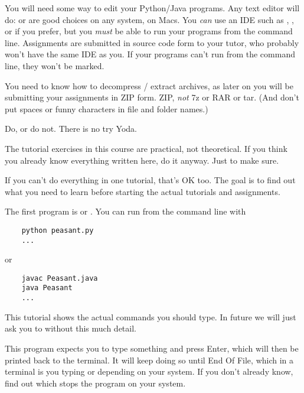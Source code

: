You will need some way to edit your Python/Java programs. Any text editor will do:
 or  are good choices on any system,  on
Macs. You \emph{can} use an IDE such as , , or 
if you prefer, but you \emph{must} be able to run your programs from the command line.
Assignments are submitted in source code form to your tutor, who probably won't have
the same IDE as you. If your programs can't run from the command line, they won't be
marked.

You need to know how to decompress / extract  archives, as later on you will
be submitting your assignments in ZIP form. ZIP, \emph{not} 7z or RAR or tar.
(And don't put spaces or funny characters in file and folder names.)



\begin{IMPORTANT}
Do, or do not. There is no try \DSH Yoda.

The tutorial exercises in this course are practical, not theoretical. If you think
you already know everything written here, do it anyway. Just to make sure.

If you can't do everything in one tutorial, that's OK too. The goal is to find
out what you need to learn before starting the actual tutorials and assignments.
\end{IMPORTANT}

The first program is  or . You can run from the
command line with
\begin{CODE}\begin{verbatim}
    python peasant.py
    ...
\end{verbatim}\end{CODE}
or
\begin{CODE}\begin{verbatim}
    javac Peasant.java
    java Peasant
    ...
\end{verbatim}\end{CODE}

\begin{IMPORTANT}
This tutorial shows the actual commands you should type. In future we will just ask you
to  without this much detail.
\end{IMPORTANT}

This program expects you to type something and press Enter, which will then be printed
back to the terminal. It will keep doing so until End Of File, which in a terminal is
you typing  or  depending on your system. If you don't
already know, find out which stops the program on your system.

